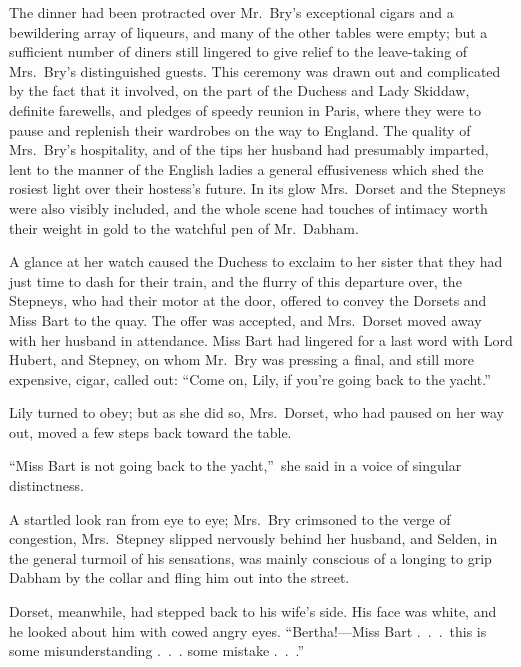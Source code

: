 \documentclass[12pt,a4paper]{book}
\begin{document}
The dinner had been protracted over Mr.\ Bry's exceptional cigars
and a bewildering array of liqueurs, and many of the other tables
were empty; but a sufficient number of diners still lingered to
give relief to the leave-taking of Mrs.\ Bry's distinguished
guests. This ceremony was drawn out and complicated by the fact
that it involved, on the part of the Duchess and Lady Skiddaw,
definite farewells, and pledges of speedy reunion in Paris, where
they were to pause and replenish their wardrobes on the way to
England. The quality of Mrs.\ Bry's hospitality, and of the tips
her husband had presumably imparted, lent to the manner of the
English ladies a general effusiveness which shed the rosiest
light over their hostess's future. In its glow Mrs.\ Dorset and
the Stepneys were also visibly included, and the whole scene had
touches of intimacy worth their weight in gold to the watchful
pen of Mr.\ Dabham.





A glance at her watch caused the Duchess to exclaim to her sister
that they had just time to dash for their train, and the flurry
of this departure over, the Stepneys, who had their motor at the
door, offered to convey the Dorsets and Miss Bart to the quay. 
The offer was accepted, and Mrs.\ Dorset moved away with her
husband in attendance. Miss Bart had lingered for a last word
with Lord Hubert, and Stepney, on whom Mr.\ Bry was pressing a
final, and still more expensive, cigar, called out: ``Come on,
Lily, if you're going back to the yacht.''





Lily turned to obey; but as she did so, Mrs.\ Dorset, who had
paused on her way out, moved a few steps back toward the table.





``Miss Bart is not going back to the yacht,''\ she said in a voice
of singular distinctness.





A startled look ran from eye to eye; Mrs.\ Bry crimsoned to the
verge of congestion, Mrs.\ Stepney slipped nervously behind her
husband, and Selden, in the general turmoil of his sensations,
was mainly conscious of a longing to grip Dabham by the collar
and fling him out into the street.





Dorset, meanwhile, had stepped back to his wife's side. His face
was white, and he looked about him with cowed angry eyes. 
``Bertha!---Miss Bart .\ .\ .\ this is some misunderstanding .\ .\ .
some mistake .\ .\ .''
\end{document}
